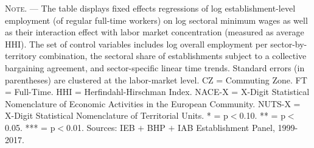 \documentclass[11pt,oneside,reqno,xcolor=dvipsnames]{article} %
\begin{document}
\begin{appendix}
\begin{refsection}
\begin{landscape}
\begin{table}[!ht]
{\begin{threeparttable}
\begin{tablenotes}
\item \footnotesize \textsc{Note. ---} The table displays fixed effects regressions of log establishment-level employment (of regular full-time workers) on log sectoral minimum wages as well as their interaction effect with labor market concentration (measured as average HHI). The set of control variables includes log overall employment per sector-by-territory combination, the sectoral share of establishments subject to a collective bargaining agreement, and sector-specific linear time trends. Standard errors (in parentheses) are clustered at the labor-market level. CZ = Commuting Zone. FT = Full-Time. HHI = Herfindahl-Hirschman Index. NACE-X = X-Digit Statistical Nomenclature of Economic Activities in the European Community. NUTS-X = X-Digit Statistical Nomenclature of Territorial Units. * = p$<$0.10. ** = p$<$0.05. *** = p$<$0.01. Sources: IEB $\plus$ BHP $\plus$ IAB Establishment Panel, 1999-2017.
\end{tablenotes}
\end{threeparttable}
}
\end{table}


\vspace*{\fill}
\clearpage



\end{landscape}
\end{refsection}
\end{appendix}
\end{document}
